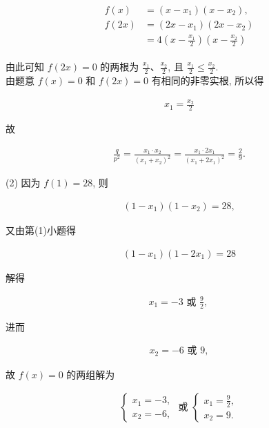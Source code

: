 \documentclass[10pt]{article}
\begin{document}
\begin{align*}
\begin{aligned}
f(x) & =\left(x-x_{1}\right)\left(x-x_{2}\right), \\
f(2 x) & =\left(2 x-x_{1}\right)\left(2 x-x_{2}\right) \\
& =4\left(x-\frac{x_{1}}{2}\right)\left(x-\frac{x_{2}}{2}\right)
\end{aligned}
\end{align*}

由此可知 $f(2 x)=0$ 的两根为 $\frac{x_{1}}{2} 、 \frac{x_{2}}{2}$, 且 $\frac{x_{1}}{2} \leqslant \frac{x_{2}}{2}$.\\
由题意 $f(x)=0$ 和 $f(2 x)=0$ 有相同的非零实根, 所以得

\begin{align*}
x_{1}=\frac{x_{2}}{2}
\end{align*}

故

\begin{align*}
\frac{q}{p^{2}}=\frac{x_{1} \cdot x_{2}}{\left(x_{1}+x_{2}\right)^{2}}=\frac{x_{1} \cdot 2 x_{1}}{\left(x_{1}+2 x_{1}\right)^{2}}=\frac{2}{9} .
\end{align*}

(2) 因为 $f(1)=28$, 则

\begin{align*}
\left(1-x_{1}\right)\left(1-x_{2}\right)=28,
\end{align*}

又由第(1)小题得

\begin{align*}
\left(1-x_{1}\right)\left(1-2 x_{1}\right)=28
\end{align*}

解得

\begin{align*}
x_{1}=-3 \text { 或 } \frac{9}{2} \text {, }
\end{align*}

进而

\begin{align*}
x_{2}=-6 \text { 或 } 9,
\end{align*}

故 $f(x)=0$ 的两组解为

\begin{align*}
\left\{\begin{array} { l } 
{ x _ { 1 } = - 3 , } \\
{ x _ { 2 } = - 6 , }
\end{array} \text { 或 } \left\{\begin{array}{l}
x_{1}=\frac{9}{2}, \\
x_{2}=9 .
\end{array}\right.\right.
\end{align*}
\end{document}
